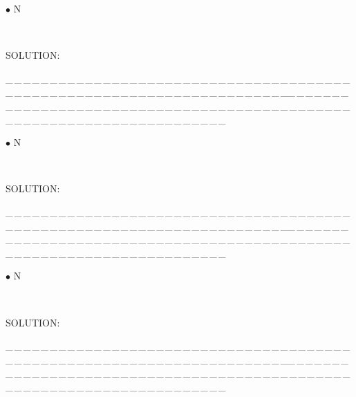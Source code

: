 \documentclass[a4paper, 11pt, UTF8]{article}
\begin{document}
\begin{large}
{\small $\bullet$}
{\timesbf\Large N} {\timessl\Large 
}\par\quad\,
{\timessl\Large
}\par
{\timesbf S\footnotesize{OLUTION:}}\par\quad

\par
{\tiny \_\,\_\,\_\,\_\,\_\,\_\,\_\,\_\,\_\,\_\,\_\,\_\,\_\,\_\,\_\,\_\,\_\,\_\,\_\,\_\,\_\,\_\,\_\,\_\,\_\,\_\,\_\,\_\,\_\,\_\,\_\,\_\,\_\,\_\,\_\,\_\,\_\,\_\,\_\,\_\,\_\,\_\,\_\,\_\,\_\,\_\,\_\,\_\,\_\,\_\,\_\,\_\,\_\,\_\,\_\,\_\,\_\,\_\,\_\,\_\,\_\,\_\,\_\,\_\,\_\,\_\,\_\,\_\,\_\,\_\,\_\_\,\_\,\_\,\_\,\_\,\_\,\_\,\_\,\_\,\_\,\_\,\_\,\_\,\_\,\_\,\_\,\_\,\_\,\_\,\_\,\_\,\_\,\_\,\_\,\_\,\_\,\_\,\_\,\_\,\_\,\_\,\_\,\_\,\_\,\_\,\_\,\_\,\_\,\_\,\_\,\_\,\_\,\_\,\_\,\_\,\_\,\_\,\_\,\_\,\_\,\_\,\_\,\_\,\_\,\_\,\_\,\_\,\_\,\_\,\_\,\_\,\_\,\_\,\_\,\_\,\_\,\_\,\_\,\_\,\_\,\_}\par

{\small $\bullet$}
{\timesbf\Large N} {\timessl\Large 
}\par\quad\,
{\timessl\Large
}\par
{\timesbf S\footnotesize{OLUTION:}}\par\quad

\par
{\tiny \_\,\_\,\_\,\_\,\_\,\_\,\_\,\_\,\_\,\_\,\_\,\_\,\_\,\_\,\_\,\_\,\_\,\_\,\_\,\_\,\_\,\_\,\_\,\_\,\_\,\_\,\_\,\_\,\_\,\_\,\_\,\_\,\_\,\_\,\_\,\_\,\_\,\_\,\_\,\_\,\_\,\_\,\_\,\_\,\_\,\_\,\_\,\_\,\_\,\_\,\_\,\_\,\_\,\_\,\_\,\_\,\_\,\_\,\_\,\_\,\_\,\_\,\_\,\_\,\_\,\_\,\_\,\_\,\_\,\_\,\_\_\,\_\,\_\,\_\,\_\,\_\,\_\,\_\,\_\,\_\,\_\,\_\,\_\,\_\,\_\,\_\,\_\,\_\,\_\,\_\,\_\,\_\,\_\,\_\,\_\,\_\,\_\,\_\,\_\,\_\,\_\,\_\,\_\,\_\,\_\,\_\,\_\,\_\,\_\,\_\,\_\,\_\,\_\,\_\,\_\,\_\,\_\,\_\,\_\,\_\,\_\,\_\,\_\,\_\,\_\,\_\,\_\,\_\,\_\,\_\,\_\,\_\,\_\,\_\,\_\,\_\,\_\,\_\,\_\,\_\,\_}\par

{\small $\bullet$}
{\timesbf\Large N} {\timessl\Large 
}\par\quad\,
{\timessl\Large
}\par
{\timesbf S\footnotesize{OLUTION:}}\par\quad

\par
{\tiny \_\,\_\,\_\,\_\,\_\,\_\,\_\,\_\,\_\,\_\,\_\,\_\,\_\,\_\,\_\,\_\,\_\,\_\,\_\,\_\,\_\,\_\,\_\,\_\,\_\,\_\,\_\,\_\,\_\,\_\,\_\,\_\,\_\,\_\,\_\,\_\,\_\,\_\,\_\,\_\,\_\,\_\,\_\,\_\,\_\,\_\,\_\,\_\,\_\,\_\,\_\,\_\,\_\,\_\,\_\,\_\,\_\,\_\,\_\,\_\,\_\,\_\,\_\,\_\,\_\,\_\,\_\,\_\,\_\,\_\,\_\_\,\_\,\_\,\_\,\_\,\_\,\_\,\_\,\_\,\_\,\_\,\_\,\_\,\_\,\_\,\_\,\_\,\_\,\_\,\_\,\_\,\_\,\_\,\_\,\_\,\_\,\_\,\_\,\_\,\_\,\_\,\_\,\_\,\_\,\_\,\_\,\_\,\_\,\_\,\_\,\_\,\_\,\_\,\_\,\_\,\_\,\_\,\_\,\_\,\_\,\_\,\_\,\_\,\_\,\_\,\_\,\_\,\_\,\_\,\_\,\_\,\_\,\_\,\_\,\_\,\_\,\_\,\_\,\_\,\_\,\_}\par


\end{large}
\end{document}
